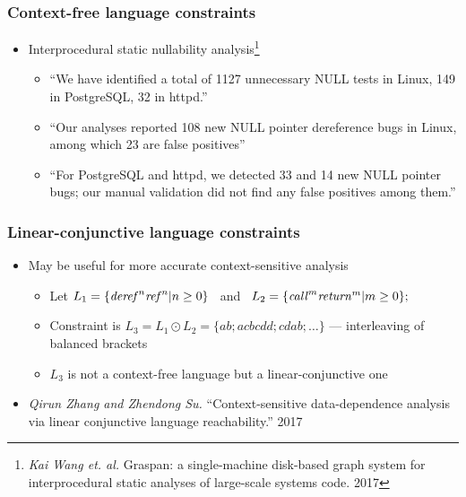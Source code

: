 \documentclass[xcolor=table,aspectratio=169]{beamer}
\begin{document}
\begin{frame}
  \transwipe[direction=90]
  \frametitle{Context-free language constraints}

\begin{itemize} 
\item Interprocedural static nullability analysis\footnote{\emph{Kai Wang et. al.} Graspan: a single-machine disk-based graph system for interprocedural 
static analyses of large-scale systems code. 2017}
  
\begin{itemize} 
   \item ``We have identified a total of 1127 unnecessary NULL tests in Linux, 149 in PostgreSQL, 
   32 in httpd.''
   \item ``Our analyses reported 108 new NULL pointer dereference bugs in Linux, among which 23 are false positives''
   \item ``For PostgreSQL and httpd, we detected 33 and 14 new NULL pointer bugs; our manual 
   validation did not find any false positives among them.''
\end{itemize}

\end{itemize}

\end{frame}

\begin{frame}
  \transwipe[direction=90]
  \frametitle{Linear-conjunctive language constraints}

\begin{itemize} 
  \item May be useful for more accurate context-sensitive analysis
    \begin{itemize}
      \item Let $L_1 = \{\text{\textit{deref}}^n \text{\textit{ref}}^n | n \geq 0\} $  \ and \ $ L_2 = \{\text{\textit{call}}^m \text{\textit{return}}^m | m \geq 0\};$ 
	  \item Constraint is $L_3 = L_1 \odot L_2 = \{a b; a c b c d d; c d a b;  \dots\}$ --- interleaving of balanced brackets
	  \item $L_3$ is not a context-free language but a linear-conjunctive one
    \end{itemize}

  \item \emph{Qirun Zhang and Zhendong Su.} ``Context-sensitive data-dependence analysis via linear conjunctive language reachability.'' 2017
  
\end{itemize}

\end{frame}
\end{document}
